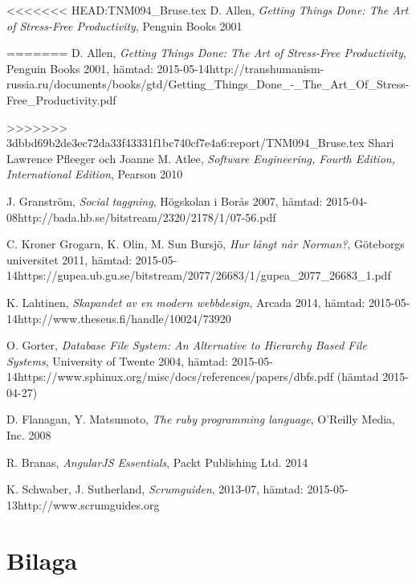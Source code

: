 \documentclass[a4paper,12pt,oneside,final]{extbook}
\begin{document}
\begin{thebibliography}{99}

<<<<<<< HEAD:TNM094_Bruse.tex
  D. Allen, \emph{Getting Things Done: The Art of Stress-Free Productivity}, Penguin Books 2001
  
=======
  D. Allen, \emph{Getting Things Done: The Art of Stress-Free Productivity}, Penguin Books 2001, hämtad: 2015-05-14\newline http://transhumanism-russia.ru/documents/books/gtd/Getting\_Things\_Done\_-\_The\_Art\_Of\_Stress-Free\_Productivity.pdf

>>>>>>> 3dbbd69b2de3ec72da33f43331f1bc740cf7e4a6:report/TNM094_Bruse.tex
  Shari Lawrence Pfleeger och Joanne M. Atlee, \emph{Software Engineering, Fourth Edition, International Edition}, Pearson 2010

  J. Granström, \emph{Social taggning}, Högskolan i Borås 2007, hämtad: 2015-04-08\newline http://bada.hb.se/bitstream/2320/2178/1/07-56.pdf

  C. Kroner Grogarn, K. Olin, M. Sun Bursjö, \emph{Hur långt når Norman?}, Göteborgs universitet 2011, hämtad: 2015-05-14\newline https://gupea.ub.gu.se/bitstream/2077/26683/1/gupea\_2077\_26683\_1.pdf

  K. Lahtinen, \emph{Skapandet av en modern webbdesign}, Arcada 2014, hämtad: 2015-05-14\newline http://www.theseus.fi/handle/10024/73920

  O. Gorter, \emph{Database File System: An Alternative to Hierarchy Based File Systems}, University of Twente 2004, hämtad: 2015-05-14\newline https://www.sphinux.org/misc/docs/references/papers/dbfs.pdf (hämtad 2015-04-27)

  D. Flanagan, Y. Matsumoto, \emph{The ruby programming language}, O'Reilly Media, Inc. 2008

  R. Branas, \emph{AngularJS Essentials}, Packt Publishing Ltd. 2014


 K. Schwaber, J. Sutherland, \emph{Scrumguiden}, 2013-07, hämtad: 2015-05-13\newline http://www.scrumguides.org

\bibitem{}
\bibitem{}
\bibitem{}
\bibitem{}
\bibitem{}
\bibitem{}
\bibitem{}
\bibitem{}
\bibitem{}
\bibitem{}
\bibitem{}

\end{thebibliography}


\appendix

\chapter{Bilaga}
\end{document}

